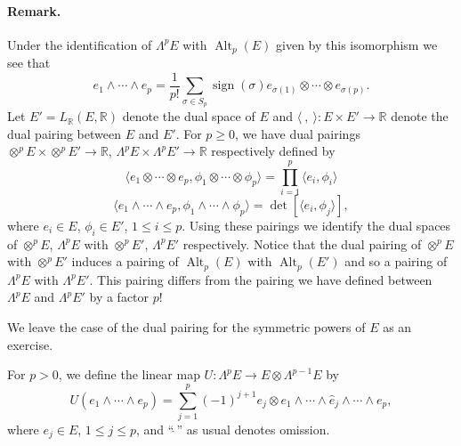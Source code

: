 \paragraph{Remark.} Under the identification of $\Lambda^p E$ with $\operatorname{Alt}_p(E)$ given by this isomorphism we see that
\[
e_1\wedge\cdots\wedge e_p=\frac1{p!}\sum_{\sigma\in S_p}\operatorname{sign}(\sigma)e_{\sigma(1)}\otimes\cdots\otimes e_{\sigma(p)}.
\]
Let $E'=L_{\mathbb R}(E,\mathbb R)$ denote the dual space of $E$ and $\langle\ ,\ \rangle:E\times E'\to\mathbb R$ denote the dual pairing between $E$ and $E'$. For $p\geq0$, we have dual pairings $\otimes^p E\times\otimes^p E'\to\mathbb R$, $\Lambda^p E\times\Lambda^p E'\to\mathbb R$ respectively defined by
\[
\langle e_1\otimes\cdots\otimes e_p,\phi_1\otimes\cdots\otimes\phi_p\rangle=\prod_{i=1}^p\langle e_i,\phi_i\rangle
\]
\[
\langle e_1\wedge\cdots\wedge e_p,\phi_1\wedge\cdots\wedge\phi_p\rangle=\det[\langle e_i,\phi_j\rangle],
\]
where $e_i\in E$, $\phi_i\in E'$, $1\leq i\leq p$. Using these pairings we identify the dual spaces of $\otimes^p E$, $\Lambda^p E$ with $\otimes^p E'$, $\Lambda^p E'$ respectively. Notice that the dual pairing of $\otimes^p E$ with $\otimes^p E'$ induces a pairing of $\operatorname{Alt}_p(E)$ with $\operatorname{Alt}_p(E')$ and so a pairing of $\Lambda^p E$ with $\Lambda^p E'$. This pairing differs from the pairing we have defined between $\Lambda^p E$ and $\Lambda^p E'$ by a factor $p!$

We leave the case of the dual pairing for the symmetric powers of $E$ as an exercise.

For $p>0$, we define the linear map $U:\Lambda^p E\to E\otimes\Lambda^{p-1}E$ by
\[
U(e_1\wedge\cdots\wedge e_p)=\sum_{j=1}^p(-1)^{j+1}e_j\otimes e_1\wedge\cdots\wedge\widehat e_j\wedge\cdots\wedge e_p,
\]
where $e_j\in E$, $1\leq j\leq p$, and ``$\widehat{\ }$'' as usual denotes omission.
